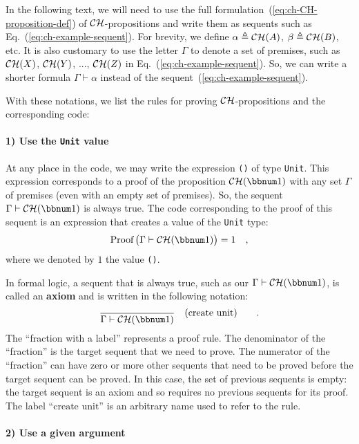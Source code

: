In the following text, we will need to use the full formulation~(\ref{eq:ch-CH-proposition-def})
of ${\cal CH}$-propositions and write them as sequents such as Eq.~(\ref{eq:ch-example-sequent}).
For brevity, we define $\alpha\triangleq{\cal CH}(A)$, $\beta\triangleq{\cal CH}(B)$,
etc. It is also customary to use the letter $\Gamma$ to denote a
set of premises, such as ${\cal CH}(X)$, ${\cal CH}(Y)$, ..., ${\cal CH}(Z)$
in Eq.~(\ref{eq:ch-example-sequent}). So, we can write a shorter
formula $\Gamma\vdash\alpha$ instead of the sequent~(\ref{eq:ch-example-sequent}).

With these notations, we list the rules for proving ${\cal CH}$-propositions
and the corresponding code:

\paragraph{1) Use the \texttt{Unit} value}

At any place in the code, we may write the expression \lstinline!()!
of type \lstinline!Unit!. This expression corresponds to a proof
of the proposition ${\cal CH}(\bbnum 1)$ with any set $\Gamma$ of
premises (even with an empty set of premises). So, the sequent $\Gamma\vdash{\cal CH}(\bbnum 1)$
is always true. The code corresponding to the proof of this sequent
is an expression that creates a value of the \lstinline!Unit! type:
\[
\text{Proof}\,\big(\Gamma\vdash{\cal CH}(\bbnum 1)\big)=1\quad,
\]
where we denoted by $1$ the value \lstinline!()!.

In formal logic, a sequent that is always true, such as our $\Gamma\vdash{\cal CH}(\bbnum 1)$,
is called an \textbf{axiom} and is written in
the following notation:
\[
\frac{}{\Gamma\vdash{\cal CH}(\bbnum 1)}\quad(\text{create unit})\quad\quad.
\]
The \textsf{``}fraction with a label\textsf{''} represents a proof rule. The denominator
of the \textsf{``}fraction\textsf{''} is the target sequent that we need to prove.
The numerator of the \textsf{``}fraction\textsf{''} can have zero or more other sequents
that need to be proved before the target sequent can be proved. In
this case, the set of previous sequents is empty: the target sequent
is an axiom and so requires no previous sequents for its proof. The
label \textsf{``}$\text{create unit}$\textsf{''} is an arbitrary name used to refer
to the rule.

\paragraph{2) Use a given argument}

